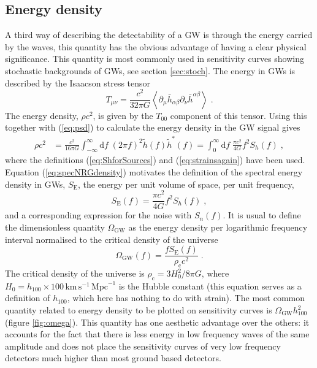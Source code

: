 \subsection{Energy density}
A third way of describing the detectability of a GW is through the energy carried by the waves, this quantity has the obvious advantage of having a clear physical significance. This quantity is most commonly used in sensitivity curves showing stochastic backgrounds of GWs, see section \ref{sec:stoch}. The energy in GWs is described by the Isaacson stress tensor \citep{MTW}
\begin{equation} T_{\mu\nu}=\frac{c^{2}}{32\pi G}\left<\partial_{\mu}\bar{h}_{\alpha\beta}\partial_{\nu}\bar{h}^{\alpha\beta}\right> \;.\end{equation}
The energy density, $\rho c^{2}$, is given by the $T_{00}$ component of this tensor. Using this together with (\ref{eq:psd}) to calculate the energy density in the GW signal gives
\begin{eqnarray}\label{eq:specNRGdensity}
\rho c^{2}&=\frac{c^{2}}{16\pi G}\int_{-\infty}^{\infty}\mathrm{d}f\;\left(2\pi f\right)^{2}\tilde{h}(f)\tilde{h}^{*}(f)=\int_{0}^{\infty}\mathrm{d}f\;\frac{\pi c^{2}}{4G}f^{2}S_{h}(f)\; ,
\end{eqnarray} 
where the definitions (\ref{eq:ShforSources}) and (\ref{eq:strainsagain}) have been used. Equation (\ref{eq:specNRGdensity}) motivates the definition of the spectral energy density in GWs, $S_{\mathrm{E}}$, the energy per unit volume of space, per unit frequency, \cite{HellingsDowns}
\begin{equation}\label{eq:spectralenergydensity} S_{\mathrm{E}}(f)=\frac{\pi c^{2}}{4G} f^{2}S_{h}(f) \; ,\end{equation}
and a corresponding expression for the noise with $S_{n}(f)$. It is usual to define the dimensionless quantity $\Omega_{\mathrm{GW}}$ as the energy density per logarithmic frequency interval normalised to the critical density of the universe
\begin{equation}\label{eq:omega} \Omega_{\mathrm{GW}}(f)=\frac{fS_{\mathrm{E}}(f)}{\rho_{\mathrm{c}}c^{2}}\; . \end{equation}
The critical density of the universe is $\rho_{\mathrm{c}}=3H_{0}^{2}/8\pi G$, where $H_{0}=h_{100}\times 100\, \mathrm{km}\,\mathrm{s}^{-1}\,\mathrm{Mpc}^{-1}$ is the Hubble constant (this equation serves as a definition of $h_{100}$, which here has nothing to do with strain). The most common quantity related to energy density to be plotted on sensitivity curves is $\Omega_{\mathrm{GW}}h_{100}^{2}$ (figure \ref{fig:omega}). This quantity has one aesthetic advantage over the others: it accounts for the fact that there is less energy in low frequency waves of the same amplitude and does not place the sensitivity curves of very low frequency detectors much higher than most ground based detectors.




